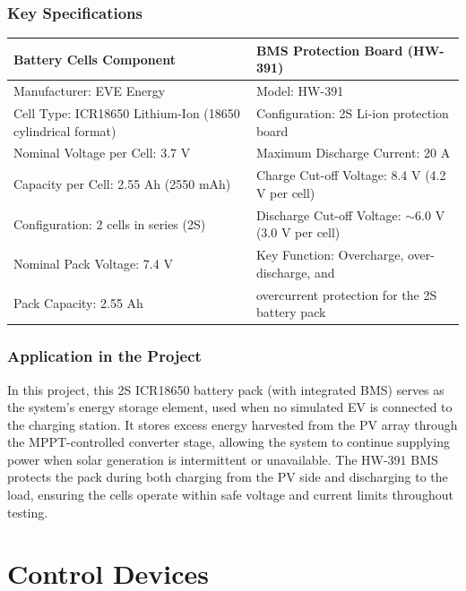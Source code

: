 \subsubsection{Key Specifications}
\renewcommand{\arraystretch}{1.3}
\begin{tabularx}{\textwidth}{X X}
    \toprule
    \textbf{Battery Cells Component} & \textbf{BMS Protection Board (HW-391)} \\
    \midrule
    Manufacturer: EVE Energy & Model: HW-391 \\
    Cell Type: ICR18650 Lithium-Ion (18650 cylindrical format) & Configuration: 2S Li-ion protection board \\
    Nominal Voltage per Cell: 3.7 V & Maximum Discharge Current: 20 A \\
    Capacity per Cell: 2.55 Ah (2550 mAh) & Charge Cut-off Voltage: 8.4 V (4.2 V per cell) \\
    Configuration: 2 cells in series (2S) & Discharge Cut-off Voltage: $\sim$6.0 V (3.0 V per cell) \\
    Nominal Pack Voltage: 7.4 V & Key Function: Overcharge, over-discharge, and \\
    Pack Capacity: 2.55 Ah & overcurrent protection for the 2S battery pack \\
    \bottomrule
\end{tabularx}

\newpage

\subsubsection{Application in the Project}
In this project, this 2S ICR18650 battery pack (with integrated BMS) serves as the system's energy storage element, used when no simulated EV is connected to the charging station. It stores excess energy harvested from the PV array through the MPPT-controlled converter stage, allowing the system to continue supplying power when solar generation is intermittent or unavailable. The HW-391 BMS protects the pack during both charging from the PV side and discharging to the load, ensuring the cells operate within safe voltage and current limits throughout testing.

\section{Control Devices}

